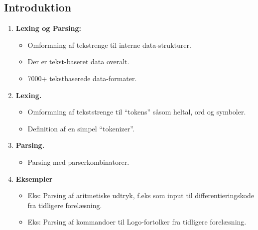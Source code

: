 \documentclass[rgb]{beamer}
\begin{document}
\popmaketitleframe

\renewcommand{\sp}{\vspace{1ex}}
\newcommand{\shead}[1]{\vspace{1ex}\head{#1}\vspace{1ex}}

\subsection*{Introduktion}

\begin{frame}[fragile]
\begin{footnotesize}


  \begin{enumerate}
  \item \textbf{Lexing og Parsing:}
    \begin{itemize}
    \item Omformning af tekstrenge til interne data-strukturer.
    \item Der er tekst-baseret data overalt.
    \item 7000+ tekstbaserede data-formater.
    \end{itemize}

  \item \textbf{Lexing.}
    \begin{itemize}
    \item Omformning af tekststrenge til ``tokens'' såsom heltal, ord
      og symboler.
    \item Definition af en simpel ``tokenizer''.
    \end{itemize}

  \item \textbf{Parsing.}
    \begin{itemize}
    \item Parsing med parserkombinatorer.
    \end{itemize}

  \item \textbf{Eksempler}
    \begin{itemize}
    \item Eks: Parsing af aritmetiske udtryk, f.eks som input til
      differentieringskode fra tidligere forelæsning.
    \item Eks: Parsing af kommandoer til Logo-fortolker fra tidligere
      forelæsning.
    \end{itemize}
  \end{enumerate}

\end{footnotesize}
\end{frame}
\end{document}
